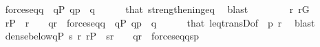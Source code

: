 \begin{isabellebody}
\ \ \isamarkupfalse%
\ {\isachardoublequoteopen}forces{\isacharunderscore}{\kern0pt}eq{\isacharparenleft}{\kern0pt}q{\isacharcomma}{\kern0pt}{\isasympi}{\isacharcomma}{\kern0pt}{\isasymsigma}{\isacharparenright}{\kern0pt}{\isachardoublequoteclose}\ \ {\isachardoublequoteopen}q{\isasymin}P{\isachardoublequoteclose}\ {\isachardoublequoteopen}q{\isasympreceq}p{\isachardoublequoteclose}\ \ q\isanewline
\ \ \ \ \isamarkupfalse%
\ that\ strengthening{\isacharunderscore}{\kern0pt}eq\ \isamarkupfalse%
\ blast\isanewline
\ \ \isamarkupfalse%
\ \isanewline
\ \ \isamarkupfalse%
\ {\isacartoucheopen}{\isasymlangle}{\isasymsigma}{\isacharcomma}{\kern0pt}r{\isasymrangle}{\isasymin}{\isasymtau}{\isacartoucheclose}\ {\isacartoucheopen}r{\isasymin}G{\isacartoucheclose}\isanewline
\ \ \isamarkupfalse%
\isanewline
\ \ \isamarkupfalse%
\ {\isachardoublequoteopen}r{\isasymin}P\ {\isasymand}\ {\isasymlangle}{\isasymsigma}{\isacharcomma}{\kern0pt}r{\isasymrangle}\ {\isasymin}\ {\isasymtau}\ {\isasymand}\ q{\isasympreceq}r\ {\isasymand}\ forces{\isacharunderscore}{\kern0pt}eq{\isacharparenleft}{\kern0pt}q{\isacharcomma}{\kern0pt}{\isasympi}{\isacharcomma}{\kern0pt}{\isasymsigma}{\isacharparenright}{\kern0pt}{\isachardoublequoteclose}\ \ {\isachardoublequoteopen}q{\isasymin}P{\isachardoublequoteclose}\ {\isachardoublequoteopen}q{\isasympreceq}p{\isachardoublequoteclose}\ \ q\isanewline
\ \ \ \ \isamarkupfalse%
\ that\ leq{\isacharunderscore}{\kern0pt}transD{\isacharbrackleft}{\kern0pt}of\ {\isacharunderscore}{\kern0pt}\ p\ r{\isacharbrackright}{\kern0pt}\ \isamarkupfalse%
\ blast\isanewline
\ \ \isamarkupfalse%
\isanewline
\ \ \isamarkupfalse%
\ {\isachardoublequoteopen}dense{\isacharunderscore}{\kern0pt}below{\isacharparenleft}{\kern0pt}{\isacharbraceleft}{\kern0pt}q{\isasymin}P{\isachardot}{\kern0pt}\ {\isasymexists}s\ r{\isachardot}{\kern0pt}\ r{\isasymin}P\ {\isasymand}\ {\isasymlangle}s{\isacharcomma}{\kern0pt}r{\isasymrangle}\ {\isasymin}\ {\isasymtau}\ {\isasymand}\ q{\isasympreceq}r\ {\isasymand}\ forces{\isacharunderscore}{\kern0pt}eq{\isacharparenleft}{\kern0pt}q{\isacharcomma}{\kern0pt}{\isasympi}{\isacharcomma}{\kern0pt}s{\isacharparenright}{\kern0pt}{\isacharbraceright}{\kern0pt}{\isacharcomma}{\kern0pt}p{\isacharparenright}{\kern0pt}{\isachardoublequoteclose}\isanewline
\ \ \ \ \isamarkupfalse%

\end{isabellebody}
